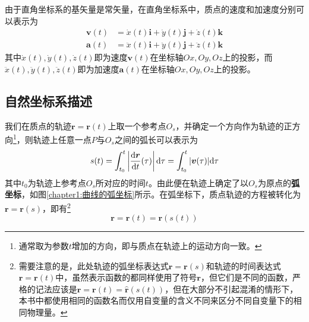 由于直角坐标系的基矢量是常矢量，在直角坐标系中，质点的速度和加速度分别可以表示为
\begin{equation}
\begin{split}
	\boldsymbol{v}(t) & = \dot{x}(t)\boldsymbol{i} + \dot{y}(t)\boldsymbol{j} + \dot{z}(t)\boldsymbol{k} \\
	\boldsymbol{a}(t) & = \ddot{x}(t)\boldsymbol{i} + \ddot{y}(t)\boldsymbol{j} + \ddot{z}(t)\boldsymbol{k}
\end{split}
\end{equation}
其中$\dot{x}(t),\dot{y}(t),\dot{z}(t)$即为速度$\boldsymbol{v}(t)$在坐标轴$Ox,Oy,Oz$上的投影，而$\ddot{x}(t),\ddot{y}(t),\ddot{z}(t)$即为加速度$\boldsymbol{a}(t)$在坐标轴$Ox,Oy,Oz$上的投影。

\subsection{自然坐标系描述}

我们在质点的轨迹$\boldsymbol{r}=\boldsymbol{r}(t)$上取一个参考点$O_s$，并确定一个方向作为轨迹的正方向\footnote{通常取为参数$t$增加的方向，即与质点在轨迹上的运动方向一致。}，则轨迹上任意一点$P$与$O_s$之间的弧长可以表示为
\begin{equation}
	s(t) = \int_{t_0}^t \left|\frac{\mathrm{d}\boldsymbol{r}}{\mathrm{d} t}(\tau)\right|\mathrm{d} \tau = \int_{t_0}^t |\boldsymbol{v}(\tau)|\mathrm{d}\tau
	\label{chapter1:弧长坐标的定义式}
\end{equation}
其中$t_0$为轨迹上参考点$O_s$所对应的时间$t$。由此便在轨迹上确定了以$O_s$为原点的{\bf 弧坐标}，如图\ref{chapter1:曲线的弧坐标}所示。在弧坐标下，质点轨迹的方程被转化为$\boldsymbol{r}=\boldsymbol{r}(s)$，即有\footnote{需要注意的是，此处轨迹的弧坐标表达式$\boldsymbol{r}=\boldsymbol{r}(s)$和轨迹的时间表达式$\boldsymbol{r}=\boldsymbol{r}(t)$中，虽然表示函数的都同样使用了符号$\boldsymbol{r}$，但它们是不同的函数，严格的记法应该是$\boldsymbol{r} = \boldsymbol{r}(t) = \hat{\boldsymbol{r}}(s(t))$，但在大部分不引起混淆的情形下，本书中都使用相同的函数名而仅用自变量的含义不同来区分不同自变量下的相同物理量。\label{chapter1:关于函数名的脚注}}
\begin{equation}
	\boldsymbol{r} = \boldsymbol{r}(t) = \boldsymbol{r}(s(t))
\end{equation}

